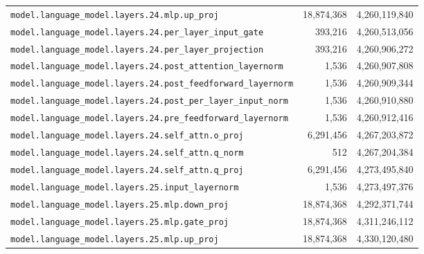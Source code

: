 \documentclass[10pt,a4paper]{article}
\theoremstyle{definition}
\begin{document}
\begin{appendices}
\begin{longtable}{p{9.5cm}rr}
\texttt{model.\allowbreak{}language\_model.\allowbreak{}layers.\allowbreak{}24.\allowbreak{}mlp.\allowbreak{}up\_proj} & 18,874,368 & 4,260,119,840 \\
\texttt{model.\allowbreak{}language\_model.\allowbreak{}layers.\allowbreak{}24.\allowbreak{}per\_layer\_input\_gate} & 393,216 & 4,260,513,056 \\
\texttt{model.\allowbreak{}language\_model.\allowbreak{}layers.\allowbreak{}24.\allowbreak{}per\_layer\_projection} & 393,216 & 4,260,906,272 \\
\texttt{model.\allowbreak{}language\_model.\allowbreak{}layers.\allowbreak{}24.\allowbreak{}post\_attention\_layernorm} & 1,536 & 4,260,907,808 \\
\texttt{model.\allowbreak{}language\_model.\allowbreak{}layers.\allowbreak{}24.\allowbreak{}post\_feedforward\_layernorm} & 1,536 & 4,260,909,344 \\
\texttt{model.\allowbreak{}language\_model.\allowbreak{}layers.\allowbreak{}24.\allowbreak{}post\_per\_layer\_input\_norm} & 1,536 & 4,260,910,880 \\
\texttt{model.\allowbreak{}language\_model.\allowbreak{}layers.\allowbreak{}24.\allowbreak{}pre\_feedforward\_layernorm} & 1,536 & 4,260,912,416 \\
\texttt{model.\allowbreak{}language\_model.\allowbreak{}layers.\allowbreak{}24.\allowbreak{}self\_attn.\allowbreak{}o\_proj} & 6,291,456 & 4,267,203,872 \\
\texttt{model.\allowbreak{}language\_model.\allowbreak{}layers.\allowbreak{}24.\allowbreak{}self\_attn.\allowbreak{}q\_norm} & 512 & 4,267,204,384 \\
\texttt{model.\allowbreak{}language\_model.\allowbreak{}layers.\allowbreak{}24.\allowbreak{}self\_attn.\allowbreak{}q\_proj} & 6,291,456 & 4,273,495,840 \\
\texttt{model.\allowbreak{}language\_model.\allowbreak{}layers.\allowbreak{}25.\allowbreak{}input\_layernorm} & 1,536 & 4,273,497,376 \\
\texttt{model.\allowbreak{}language\_model.\allowbreak{}layers.\allowbreak{}25.\allowbreak{}mlp.\allowbreak{}down\_proj} & 18,874,368 & 4,292,371,744 \\
\texttt{model.\allowbreak{}language\_model.\allowbreak{}layers.\allowbreak{}25.\allowbreak{}mlp.\allowbreak{}gate\_proj} & 18,874,368 & 4,311,246,112 \\
\texttt{model.\allowbreak{}language\_model.\allowbreak{}layers.\allowbreak{}25.\allowbreak{}mlp.\allowbreak{}up\_proj} & 18,874,368 & 4,330,120,480 \\

\end{longtable}
\end{appendices}
\end{document}

